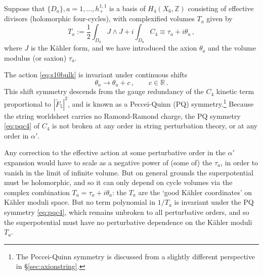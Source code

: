 \documentclass[12pt,a4wide]{article}
\begin{document}
Suppose that $\{D_a\}, a=1,\ldots, h^{1,1}_+$ is a basis of $H_4(X_6,\mathbb{Z})$ consisting of effective divisors (holomorphic four-cycles), with complexified volumes $T_a$ given by
\begin{equation}\label{eq:tdef}
    T_a := \frac{1}{2}\int_{D_a}  J \wedge J + i \int_{D_a} C_4 \equiv \tau_a + i \theta_a\,,
\end{equation}
where $J$ is the K\"ahler form, and we have introduced 
the axion $\theta_a$ and the volume modulus (or saxion) $\tau_a$.

The action \eqref{eq:s10bulk} is invariant under continuous shifts
\begin{equation}\label{eq:pqc4}
\theta_a \to \theta_a + c\,, \qquad c\in \mathbb{R}\,.
\end{equation}
This shift symmetry descends from the gauge redundancy of the $C_4$ kinetic term proportional to $|\tilde{F}_5|^2$, and is known as a Peccei-Quinn (PQ) symmetry.\footnote{The Peccei-Quinn symmetry is discussed from a slightly different perspective in \S\ref{sec:axionstring}.} 
Because the string worldsheet carries no Ramond-Ramond charge, the PQ symmetry \eqref{eq:pqc4} of $C_4$ is not broken at any order in string perturbation theory, or at any order in $\alpha'$.
 

 
Any correction to the effective action at some perturbative order in the $\alpha'$ expansion would have to scale as a negative power of (some of) the $\tau_a$, in order to vanish in the limit of infinite volume.  
But on general grounds the superpotential must be holomorphic, and so it can only depend on cycle volumes via the complex combination $T_a = \tau_a + i\theta_a$: the $T_a$ are the `good K\"ahler coordinates' on K\"ahler moduli space. 
But no term polynomial in $1/T_a$ is invariant under 
the PQ symmetry \eqref{eq:pqc4}, which remains unbroken to all perturbative orders, and so the superpotential must have no perturbative dependence on the K\"ahler moduli $T_a$.
 
\end{document}
